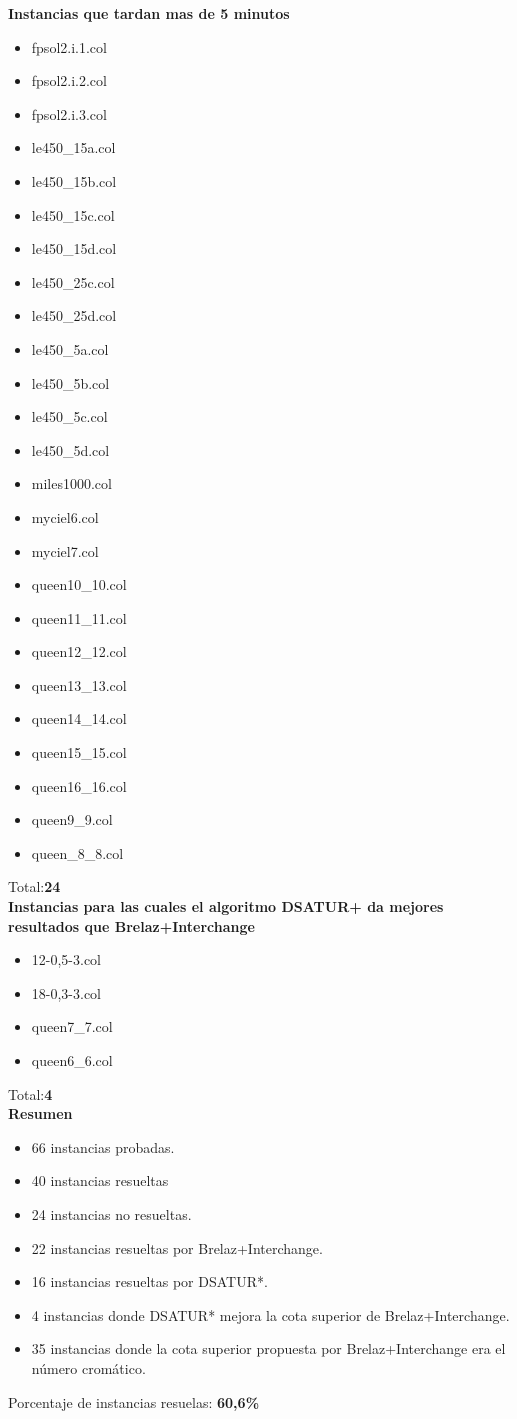 \documentclass[a4paper,10pt]{article}
\begin{document}
\textbf{Instancias que tardan mas de 5 minutos}
\begin{itemize}
 \item fpsol2.i.1.col
 \item fpsol2.i.2.col
 \item fpsol2.i.3.col
 \item le450_15a.col
 \item le450_15b.col
 \item le450_15c.col
 \item le450_15d.col
 \item le450_25c.col
 \item le450_25d.col
 \item le450_5a.col
 \item le450_5b.col
 \item  le450_5c.col
 \item le450_5d.col
 \item miles1000.col
 \item myciel6.col
\item myciel7.col
\item queen10_10.col
\item queen11_11.col
\item queen12_12.col
\item queen13_13.col
\item queen14_14.col
\item queen15_15.col
\item queen16_16.col
\item queen9_9.col
\item queen_8_8.col

\end{itemize}
\indent Total:\textbf{24}\\

\textbf{Instancias para las cuales el algoritmo DSATUR+ da mejores resultados que Brelaz+Interchange}
\begin{itemize}
 \item 12-0,5-3.col
 \item 18-0,3-3.col
 \item queen7\_7.col
\item queen6_6.col

\end{itemize}
\indent Total:\textbf{4}\\

\textbf{Resumen}
\begin{itemize}
 \item 66 instancias probadas.
 \item 40 instancias resueltas
 \item 24 instancias no resueltas.
 \item 22 instancias resueltas por Brelaz+Interchange.
 \item 16 instancias resueltas por DSATUR*.
 \item 4 instancias donde DSATUR* mejora la cota superior de
       Brelaz+Interchange.
 \item 35 instancias donde la cota superior propuesta por
       Brelaz+Interchange era el n\'umero crom\'atico.
\end{itemize}
\indent Porcentaje de instancias resuelas: \textbf{60,6\%}
\end{document}
